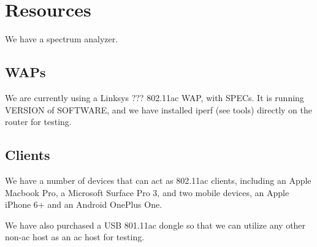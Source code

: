 \section{Resources}

We have a spectrum analyzer.

\subsection{WAPs}


We are currently using a Linksys ??? 802.11ac WAP, with SPECs. It is running
VERSION of SOFTWARE, and we have installed iperf (see tools) directly on the
router for testing.


\subsection{Clients}

We have a number of devices that can act as
802.11ac clients, including an Apple Macbook Pro, a Microsoft Surface Pro 3,
and two mobile devices, an Apple iPhone 6+ and an Android OnePlus
One.

We have also purchased a USB 801.11ac dongle so that we can utilize any other
non-ac host as an ac host for testing.

